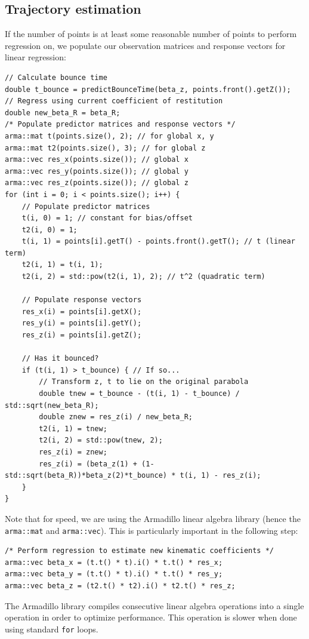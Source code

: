 \documentclass[letterpaper, 11pt]{article}
\begin{document}
\subsection{Trajectory estimation}
If the number of points is at least some reasonable number of points to perform regression on, we populate our observation matrices and response vectors for linear regression:
\begin{verbatim}
// Calculate bounce time
double t_bounce = predictBounceTime(beta_z, points.front().getZ());
// Regress using current coefficient of restitution
double new_beta_R = beta_R;
/* Populate predictor matrices and response vectors */
arma::mat t(points.size(), 2); // for global x, y
arma::mat t2(points.size(), 3); // for global z
arma::vec res_x(points.size()); // global x
arma::vec res_y(points.size()); // global y
arma::vec res_z(points.size()); // global z
for (int i = 0; i < points.size(); i++) {
    // Populate predictor matrices
    t(i, 0) = 1; // constant for bias/offset
    t2(i, 0) = 1;
    t(i, 1) = points[i].getT() - points.front().getT(); // t (linear term)
    t2(i, 1) = t(i, 1);
    t2(i, 2) = std::pow(t2(i, 1), 2); // t^2 (quadratic term)

    // Populate response vectors
    res_x(i) = points[i].getX();
    res_y(i) = points[i].getY();
    res_z(i) = points[i].getZ();

    // Has it bounced?
    if (t(i, 1) > t_bounce) { // If so...
        // Transform z, t to lie on the original parabola
        double tnew = t_bounce - (t(i, 1) - t_bounce) / std::sqrt(new_beta_R);
        double znew = res_z(i) / new_beta_R;
        t2(i, 1) = tnew;
        t2(i, 2) = std::pow(tnew, 2);
        res_z(i) = znew;
        res_z(i) = (beta_z(1) + (1-std::sqrt(beta_R))*beta_z(2)*t_bounce) * t(i, 1) - res_z(i);
    }
}
\end{verbatim}

Note that for speed, we are using the Armadillo linear algebra library (hence the \verb|arma::mat| and \verb|arma::vec|). This is particularly important in the following step:
\begin{verbatim}
/* Perform regression to estimate new kinematic coefficients */
arma::vec beta_x = (t.t() * t).i() * t.t() * res_x;
arma::vec beta_y = (t.t() * t).i() * t.t() * res_y;
arma::vec beta_z = (t2.t() * t2).i() * t2.t() * res_z;
\end{verbatim}
The Armadillo library compiles consecutive linear algebra operations into a single operation in order to optimize performance. This operation is slower when done using standard \texttt{for} loops.
\end{document}
